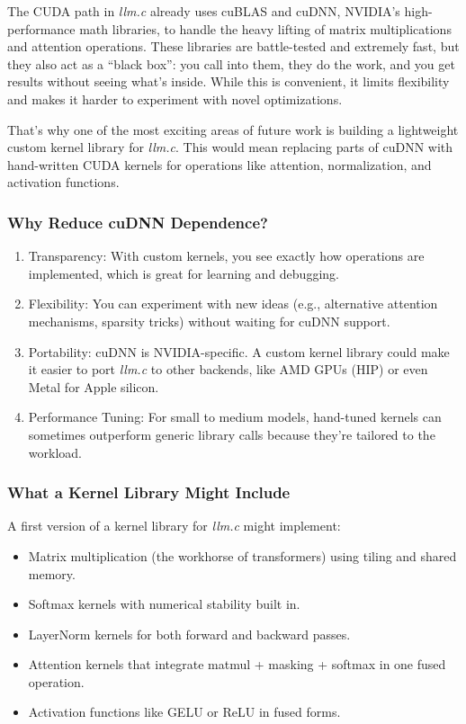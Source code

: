 \documentclass[
  letterpaper,
  DIV=11,
  numbers=noendperiod]{scrreprt}
\providecommand{\tightlist}{%
  \setlength{\itemsep}{0pt}\setlength{\parskip}{0pt}}
\begin{document}
The CUDA path in \emph{llm.c} already uses cuBLAS and cuDNN, NVIDIA's
high-performance math libraries, to handle the heavy lifting of matrix
multiplications and attention operations. These libraries are
battle-tested and extremely fast, but they also act as a ``black box'':
you call into them, they do the work, and you get results without seeing
what's inside. While this is convenient, it limits flexibility and makes
it harder to experiment with novel optimizations.

That's why one of the most exciting areas of future work is building a
lightweight custom kernel library for \emph{llm.c}. This would mean
replacing parts of cuDNN with hand-written CUDA kernels for operations
like attention, normalization, and activation functions.

\subsubsection{Why Reduce cuDNN
Dependence?}\label{why-reduce-cudnn-dependence}

\begin{enumerate}
\def\labelenumi{\arabic{enumi}.}
\tightlist
\item
  Transparency: With custom kernels, you see exactly how operations are
  implemented, which is great for learning and debugging.
\item
  Flexibility: You can experiment with new ideas (e.g., alternative
  attention mechanisms, sparsity tricks) without waiting for cuDNN
  support.
\item
  Portability: cuDNN is NVIDIA-specific. A custom kernel library could
  make it easier to port \emph{llm.c} to other backends, like AMD GPUs
  (HIP) or even Metal for Apple silicon.
\item
  Performance Tuning: For small to medium models, hand-tuned kernels can
  sometimes outperform generic library calls because they're tailored to
  the workload.
\end{enumerate}

\subsubsection{What a Kernel Library Might
Include}\label{what-a-kernel-library-might-include}

A first version of a kernel library for \emph{llm.c} might implement:

\begin{itemize}
\tightlist
\item
  Matrix multiplication (the workhorse of transformers) using tiling and
  shared memory.
\item
  Softmax kernels with numerical stability built in.
\item
  LayerNorm kernels for both forward and backward passes.
\item
  Attention kernels that integrate matmul + masking + softmax in one
  fused operation.
\item
  Activation functions like GELU or ReLU in fused forms.
\end{itemize}
\end{document}

